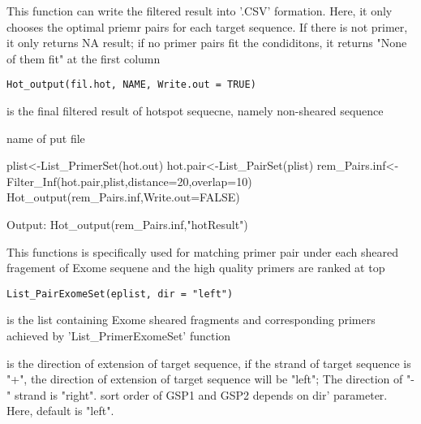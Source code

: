 \documentclass[a4paper]{book}
\begin{document}
%
\begin{Description}\relax
This function can write the filtered result into '.CSV' formation. Here, it only chooses the optimal
priemr pairs for each target sequence. If there is not primer, it only returns NA result; if  no
primer pairs fit the condiditons, it returns "None of them fit" at the first column
\end{Description}
%
\begin{Usage}
\begin{verbatim}
Hot_output(fil.hot, NAME, Write.out = TRUE)
\end{verbatim}
\end{Usage}
%
\begin{Arguments}
\begin{ldescription}
\item[\code{fil.hot}] is the final filtered result of hotspot sequecne, namely non-sheared sequence

\item[\code{NAME}] name of put file
\end{ldescription}
\end{Arguments}
%
\begin{Examples}
\begin{ExampleCode}
plist<-List_PrimerSet(hot.out)
hot.pair<-List_PairSet(plist)
rem_Pairs.inf<-Filter_Inf(hot.pair,plist,distance=20,overlap=10)
Hot_output(rem_Pairs.inf,Write.out=FALSE)

Output:
Hot_output(rem_Pairs.inf,"hotResult")
\end{ExampleCode}
\end{Examples}
%
\begin{Description}\relax
This functions is specifically used for matching primer pair under each sheared fragement of Exome sequene and
the high quality primers are ranked at top
\end{Description}
%
\begin{Usage}
\begin{verbatim}
List_PairExomeSet(eplist, dir = "left")
\end{verbatim}
\end{Usage}
%
\begin{Arguments}
\begin{ldescription}
\item[\code{eplist}] is the list containing Exome sheared fragments and  corresponding primers achieved by 'List\_PrimerExomeSet' function

\item[\code{dir}] is the direction of extension of target sequence, if the strand of target sequence
is "+", the direction of extension of target sequence will be "left"; The direction of
"-" strand is "right". sort order of GSP1 and GSP2 depends on dir' parameter. Here, default is "left".
\end{ldescription}
\end{Arguments}
\end{document}
